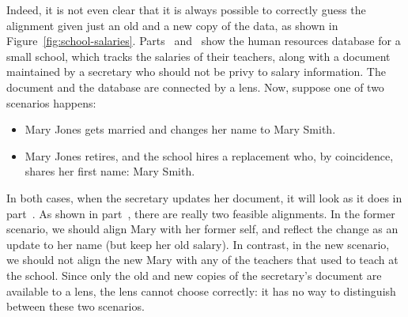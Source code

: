 Indeed, it is not even clear that it is always possible to correctly guess
the alignment given just an old and a new copy of the data, as shown in
Figure~\ref{fig:school-salaries}. Parts~
and~ show the human resources database
for a small school, which tracks the salaries of their teachers, along with
a document maintained by a secretary who should not be privy to salary
information. The document and the database are connected by a \map lens.
Now, suppose one of two scenarios happens:
\begin{itemize}
    \item Mary Jones gets married and changes her name to Mary Smith.
    \item Mary Jones retires, and the school hires a replacement who, by
        coincidence, shares her first name: Mary Smith.
\end{itemize}
In both cases, when the secretary updates her document, it will look as it
does in part~. As shown in
part~, there are really two feasible
alignments. In the former scenario, we should align Mary with her former
self, and reflect the change as an update to her name (but keep her old
salary). In contrast, in the new scenario, we should not align the new Mary
with any of the teachers that used to teach at the school. Since only the
old and new copies of the secretary's document are available to a lens, the
lens cannot choose correctly: it has no way to distinguish between these two
scenarios.

